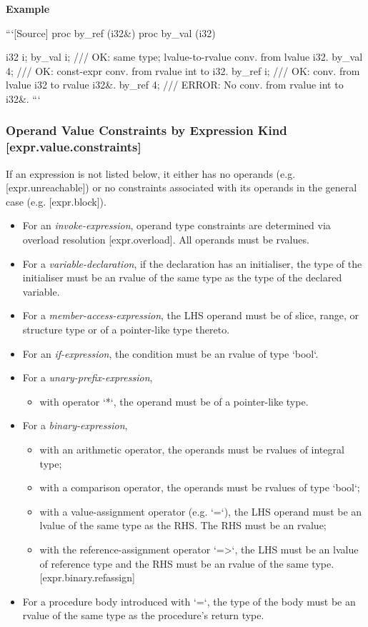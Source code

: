 \documentclass[a4paper, 12pt, oneside, final]{article}
\def\sref[#1]{[#1]}
\def\Paragraph#1{\ifvmode\else\unskip\par\fi\noindent \textbf{#1}\par\penalty10000}
\def\Example{\Paragraph{Example}}
\begin{document}
\Example
```[Source]
proc by_ref (i32&) {}
proc by_val (i32) {}

i32 i;
by_val i; /// OK: same type; lvalue-to-rvalue conv. from lvalue i32.
by_val 4; /// OK: const-expr conv. from rvalue int to i32.
by_ref i; /// OK: conv. from lvalue i32 to rvalue i32&.
by_ref 4; /// ERROR: No conv. from rvalue int to i32&.
```

\subsubsection{Operand Value Constraints by Expression Kind [expr.value.constraints]}
If an expression is not listed below, it either has no operands (e.g. \sref[expr.unreachable]) or no constraints
associated with its operands in the general case (e.g. \sref[expr.block]).

\begin{itemize}
\item For an \emph{invoke-expression}, operand type constraints are determined via overload resolution \sref[expr.overload].
      All operands must be rvalues.
\item For a \emph{variable-declaration}, if the declaration has an initialiser, the type of the initialiser must be
      an rvalue of the same type as the type of the declared variable.
\item For a \emph{member-access-expression}, the LHS operand must be of slice, range, or structure type or of
      a pointer-like type thereto.
\item For an \emph{if-expression}, the condition must be an rvalue of type `bool`.
\item For a \emph{unary-prefix-expression},
      \begin{itemize}
        \item with operator `*`, the operand must be of a pointer-like type.
      \end{itemize}
\item For a \emph{binary-expression},
      \begin{itemize}
          \item with an arithmetic operator, the operands must be rvalues of integral type;
          \item with a comparison operator, the operands must be rvalues of type `bool`;
          \item with a value-assignment operator (e.g. `=`), the LHS operand must be an lvalue
                of the same type as the RHS. The RHS must be an rvalue;
          \item with the reference-assignment operator `=>`, the LHS must be an lvalue of reference type
                and the RHS must be an rvalue of the same type. \sref[expr.binary.refassign]
      \end{itemize}
\item For a procedure body introduced with `=`, the type of the body must be an rvalue of the same
      type as the procedure’s return type.
\end{itemize}
\end{document}
